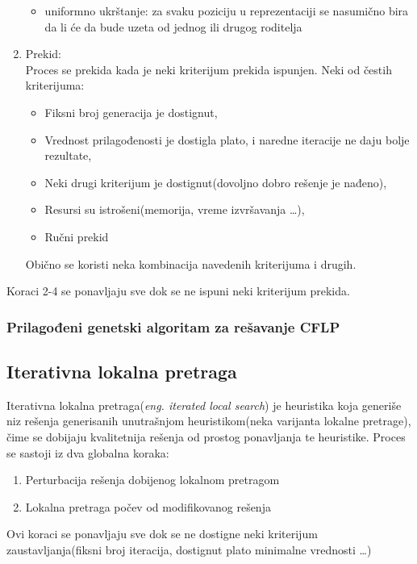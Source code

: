 \documentclass[a4paper]{article}
\begin{document}
\begin{enumerate}
\begin{itemize}
\item uniformno ukrštanje: za svaku poziciju u reprezentaciji se nasumično bira da li će da bude uzeta od jednog ili drugog roditelja
\end{itemize}
\item Prekid: \\ Proces se prekida kada je neki kriterijum prekida ispunjen. Neki od čestih kriterijuma:
\begin{itemize}
\item Fiksni broj generacija je dostignut,
\item Vrednost prilagođenosti je dostigla plato, i naredne iteracije ne daju bolje rezultate,
\item Neki drugi kriterijum je dostignut(dovoljno dobro rešenje je nađeno),
\item Resursi su istrošeni(memorija, vreme izvršavanja \ldots),
\item Ručni prekid
\end{itemize}
Obično se koristi neka kombinacija navedenih kriterijuma i drugih.
\end{enumerate}

 Koraci 2-4 se ponavljaju sve dok se ne ispuni neki kriterijum prekida.

\subsubsection{Prilagođeni genetski algoritam za rešavanje CFLP}

\subsection{Iterativna lokalna pretraga}

Iterativna lokalna pretraga(\emph{eng. iterated local search}) je heuristika koja generiše niz rešenja generisanih unutrašnjom heuristikom(neka varijanta lokalne pretrage), čime se dobijaju kvalitetnija rešenja od prostog ponavljanja te heuristike\cite{lourenccoils}. 
Proces se sastoji iz dva globalna koraka:
\begin{enumerate}
\item Perturbacija rešenja dobijenog lokalnom pretragom
\item Lokalna pretraga počev od modifikovanog rešenja
\end{enumerate}

Ovi koraci se ponavljaju sve dok se ne dostigne neki kriterijum zaustavljanja(fiksni broj iteracija, dostignut plato minimalne vrednosti \ldots)
\end{document}
